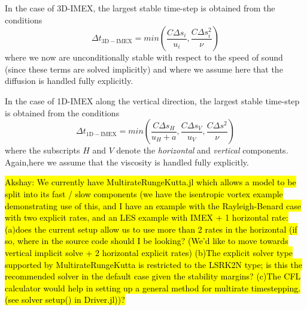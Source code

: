 \documentclass{report}
\numberwithin{equation}{section}
\begin{document}
In the case of 3D-IMEX, the largest stable time-step is obtained from the conditions
\[
\Delta t_{\mathrm{3D-IMEX}} = min \left( \frac{C \Delta s_i}{u_i}, \frac{C \Delta s_i^2}{\nu} \right)
\]
where we now are unconditionally stable with respect to the speed of sound (since these terms are solved implicitly) and where we assume here that the diffusion is handled fully explicitly.

In the case of 1D-IMEX along the vertical direction, the largest stable time-step is obtained from the conditions
\[
\Delta t_{\mathrm{1D-IMEX}} = min \left( \frac{C \Delta s_H}{u_H+a}, \frac{C \Delta s_V}{u_V}, \frac{C \Delta s^2}{\nu} \right)
\]
where the subscripts $H$ and $V$ denote the \emph{horizontal} and \emph{vertical} components. Again,here we assume that the viscosity is handled fully explicitly.

\hl{Akshay: We currently have MultirateRungeKutta.jl which allows a model to be split into its fast / slow components (we have the isentropic vortex example demonstrating use of this, and I have an example with the Rayleigh-Benard case with two explicit rates, and an LES example with IMEX + 1 horizontal rate: (a)does the current setup allow us to use more than 2 rates in the horizontal (if so, where in the source code should I be looking? (We'd like to move towards vertical implicit solve + 2 horizontal explicit rates) (b)The explicit solver type supported by MultirateRungeKutta is restricted to the LSRK2N type; is this the recommended solver in the default case given the stability margins? (c)The CFL calculator would help in setting up a general method for multirate timestepping. (see solver setup() in Driver.jl))?}


\end{document}
